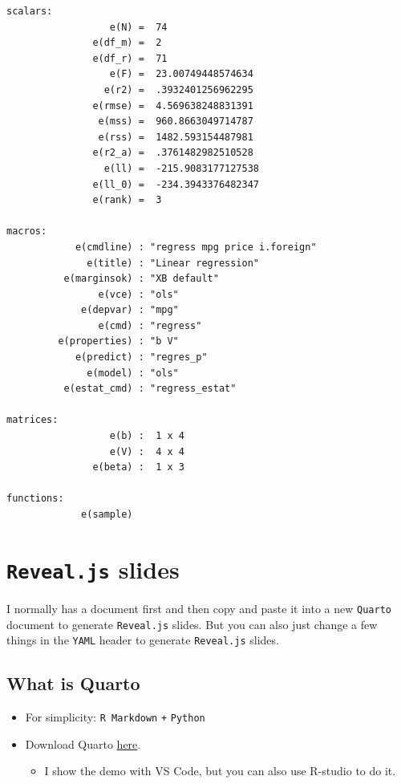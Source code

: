 \documentclass[
  letterpaper,
  DIV=11,
  numbers=noendperiod]{scrartcl}
\providecommand{\tightlist}{%
  \setlength{\itemsep}{0pt}\setlength{\parskip}{0pt}}\usepackage{longtable,booktabs,array}
\begin{document}
\begin{verbatim}
scalars:
                  e(N) =  74
               e(df_m) =  2
               e(df_r) =  71
                  e(F) =  23.00749448574634
                 e(r2) =  .3932401256962295
               e(rmse) =  4.569638248831391
                e(mss) =  960.8663049714787
                e(rss) =  1482.593154487981
               e(r2_a) =  .3761482982510528
                 e(ll) =  -215.9083177127538
               e(ll_0) =  -234.3943376482347
               e(rank) =  3

macros:
            e(cmdline) : "regress mpg price i.foreign"
              e(title) : "Linear regression"
          e(marginsok) : "XB default"
                e(vce) : "ols"
             e(depvar) : "mpg"
                e(cmd) : "regress"
         e(properties) : "b V"
            e(predict) : "regres_p"
              e(model) : "ols"
          e(estat_cmd) : "regress_estat"

matrices:
                  e(b) :  1 x 4
                  e(V) :  4 x 4
               e(beta) :  1 x 3

functions:
             e(sample)   
\end{verbatim}

\hypertarget{reveal.js-slides}{%
\section{\texorpdfstring{\texttt{Reveal.js}
slides}{Reveal.js slides}}\label{reveal.js-slides}}

I normally has a document first and then copy and paste it into a new
\texttt{Quarto} document to generate \texttt{Reveal.js} slides. But you
can also just change a few things in the \texttt{YAML} header to
generate \texttt{Reveal.js} slides.

\hypertarget{what-is-quarto-1}{%
\subsection{What is Quarto}\label{what-is-quarto-1}}

\begin{itemize}
\item
  For simplicity: \texttt{R\ Markdown} \texttt{+} \texttt{Python}
\item
  Download Quarto \href{https://quarto.org/docs/get-started/}{here}.

  \begin{itemize}
  \tightlist
  \item
    I show the demo with VS Code, but you can also use R-studio to do
    it.
  \end{itemize}
\end{itemize}
\end{document}
